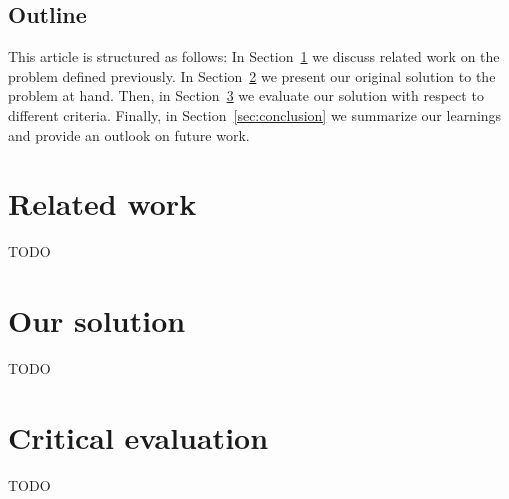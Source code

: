 \documentclass{IEEEtran}
\begin{document}
    \subsection*{Outline}
    This article is structured as follows:
    In Section~\ref{sec:differentiation} we discuss related work on the problem defined previously.
    In Section~\ref{sec:contribution} we present our original solution to the problem at hand.
    Then, in Section~\ref{sec:evaluation} we evaluate our solution with respect to different criteria.
    Finally, in Section~\ref{sec:conclusion} we summarize our learnings and provide an outlook on future work.
    
    \section{Related work}
    \label{sec:differentiation}
    TODO

    \section{Our solution}
    \label{sec:contribution}
    TODO 

    \section{Critical evaluation}
    \label{sec:evaluation}
    TODO
\end{document}
